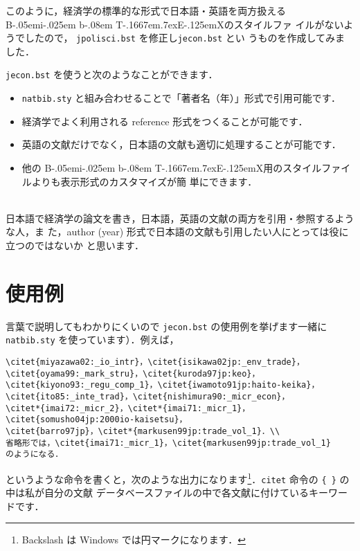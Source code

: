 \documentclass[a4j,10pt]{jarticle}
\def\BibTeX{{\rm B\kern-.05em{\sc i\kern-.025em b}\kern-.08em
    T\kern-.1667em\lower.7ex\hbox{E}\kern-.125emX}}
\begin{document}
このように，経済学の標準的な形式で日本語・英語を両方扱える \BibTeX のスタイルファ
イルがないようでしたので， \texttt{jpolisci.bst} を修正し\texttt{jecon.bst} とい
うものを作成してみました．

\texttt{jecon.bst} を使うと次のようなことができます．
\\

\begin{screen}
 \begin{itemize}
 \item \texttt{natbib.sty} と組み合わせることで「著者名（年）」形式で引用可能です．
 \item 経済学でよく利用される reference 形式をつくることが可能です．
 \item 英語の文献だけでなく，日本語の文献も適切に処理することが可能です．
 \item 他の \BibTeX 用のスタイルファイルよりも表示形式のカスタマイズが簡
       単にできます．
 \end{itemize}
\end{screen}
\\

日本語で経済学の論文を書き，日本語，英語の文献の両方を引用・参照するような人，ま
た，author (year) 形式で日本語の文献も引用したい人にとっては役に立つのではないか
と思います．

\section{使用例}

言葉で説明してもわかりにくいので \texttt{jecon.bst} の使用例を挙げます一緒に
\texttt{natbib.sty} を使っています）．例えば，
\begin{screen}
\begin{verbatim}
\citet{miyazawa02:_io_intr}，\citet{isikawa02jp:_env_trade}，
\citet{oyama99:_mark_stru}，\citet{kuroda97jp:keo}，
\citet{kiyono93:_regu_comp_1}，\citet{iwamoto91jp:haito-keika}，
\citet{ito85:_inte_trad}，\citet{nishimura90:_micr_econ}，
\citet*{imai72:_micr_2}，\citet*{imai71:_micr_1}，
\citet{somusho04jp:2000io-kaisetsu}，
\citet{barro97jp}，\citet*{markusen99jp:trade_vol_1}．\\
省略形では，\citet{imai71:_micr_1}，\citet{markusen99jp:trade_vol_1}
のようになる．
\end{verbatim}
\end{screen}
というような命令を書くと，次のような出力になります\footnote{Backslash は Windows
では円マークになります．}．\texttt{citet} 命令の \verb|{ }| の中は私が自分の文献
データベースファイルの中で各文献に付けているキーワードです．
\end{document}
